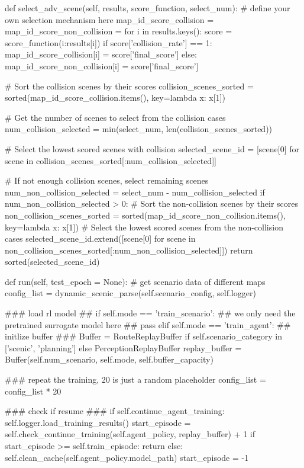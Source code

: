 \begin{appendix}
def select\_adv\_scene(self, results, score\_function, select\_num):
\# define your own selection mechanism here
map\_id\_score\_collision = {}
map\_id\_score\_non\_collision = {}
for i in results.keys():
score = score\_function({i:results[i]})
if score['collision\_rate'] == 1:
map\_id\_score\_collision[i] = score['final\_score']
else:
map\_id\_score\_non\_collision[i] = score['final\_score']

\# Sort the collision scenes by their scores
collision\_scenes\_sorted = sorted(map\_id\_score\_collision.items(), key=lambda x: x[1])

\# Get the number of scenes to select from the collision cases
num\_collision\_selected = min(select\_num, len(collision\_scenes\_sorted))

\# Select the lowest scored scenes with collision
selected\_scene\_id = [scene[0] for scene in collision\_scenes\_sorted[:num\_collision\_selected]]

\# If not enough collision scenes, select remaining scenes
num\_non\_collision\_selected = select\_num - num\_collision\_selected
if num\_non\_collision\_selected > 0:
\# Sort the non-collision scenes by their scores
non\_collision\_scenes\_sorted = sorted(map\_id\_score\_non\_collision.items(), key=lambda x: x[1])
\# Select the lowest scored scenes from the non-collision cases
selected\_scene\_id.extend([scene[0] for scene in non\_collision\_scenes\_sorted[:num\_non\_collision\_selected]])
return sorted(selected\_scene\_id)

def run(self, test\_epoch = None):
\# get scenario data of different maps
config\_list = dynamic\_scenic\_parse(self.scenario\_config, self.logger)


\#\#\# load rl model \#\#
if self.mode == 'train\_scenario':
\#\# we only need the pretrained surrogate model here \#\#
pass
elif self.mode == 'train\_agent':
\#\# initlize buffer \#\#\#
Buffer = RouteReplayBuffer if self.scenario\_category in ['scenic', 'planning'] else PerceptionReplayBuffer
replay\_buffer = Buffer(self.num\_scenario, self.mode, self.buffer\_capacity)

\#\#\# repeat the training, 20 is just a random placeholder
config\_list = config\_list * 20

\#\#\# check if resume \#\#\#
if self.continue\_agent\_training:
self.logger.load\_training\_results()
start\_episode = self.check\_continue\_training(self.agent\_policy, replay\_buffer) + 1
if start\_episode >= self.train\_episode:
return
else:
self.clean\_cache(self.agent\_policy.model\_path)
start\_episode = -1


\end{appendix}
